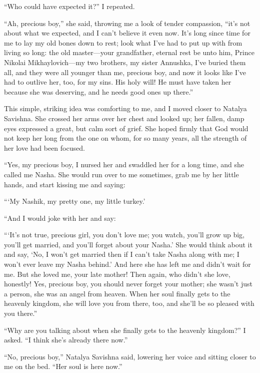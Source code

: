 ``Who could have expected it?'' I repeated. %

``Ah, precious boy,'' she said, throwing me a look of tender compassion, ``it's not about what we expected, and I can't believe it even now. It's long since time for me to lay my old bones down to rest; look what I've had to put up with from living so long: the old master---your grandfather, eternal rest be unto him, Prince Nikolai Mikhaylovich---my two brothers, my sister Annushka, I've buried them all, and they were all younger than me, precious boy, and now it looks like I've had to outlive her, too, for my sins. His holy will! He must have taken her because she was deserving, and he needs good ones up there.'' %

This simple, striking idea was comforting to me, and I moved closer to Natalya Savishna. She crossed her arms over her chest and looked up; her fallen, damp eyes expressed a great, but calm sort of grief. She hoped firmly that God would not keep her long from the one on whom, for so many years, all the strength of her love had been focused.

``Yes, my precious boy, I nursed her and swaddled her for a long time, and she called me Nasha. She would run over to me sometimes, grab me by her little hands, and start kissing me and saying: %

```My Nashik, my pretty one, my little turkey.' %

``And I would joke with her and say: %

```It's not true, precious girl, you don't love me; you watch, you'll grow up big, you'll get married, and you'll forget about your Nasha.' She would think about it and say, `No, I won't get married then if I can't take Nasha along with me; I won't ever leave my Nasha behind.' And here she has left me and didn't wait for me. But she loved me, your late mother! Then again, who didn't she love, honestly! Yes, precious boy, you should never forget your mother; she wasn't just a person, she was an angel from heaven. When her soul finally gets to the heavenly kingdom, she will love you from there, too, and she'll be so pleased with you there.'' %

``Why are you talking about when she finally gets to the heavenly kingdom?'' I asked. ``I think she's already there now.'' %

``No, precious boy,'' Natalya Savishna said, lowering her voice and sitting closer to me on the bed. ``Her soul is here now.'' %

